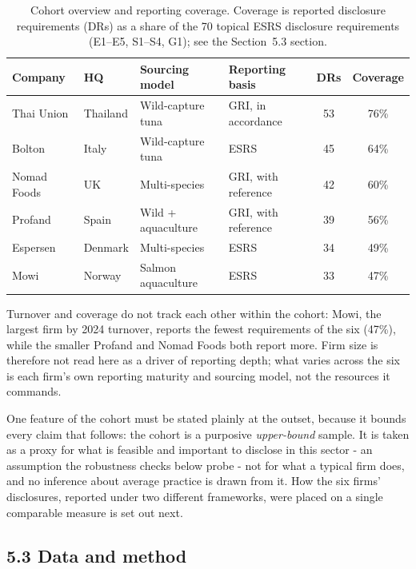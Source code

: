 \begin{table}[H]
\centering
\caption{Cohort overview and reporting coverage. Coverage is reported
disclosure requirements (DRs) as a share of the 70 topical ESRS disclosure
requirements (E1--E5, S1--S4, G1); see the Section~5.3 section.}
\label{tab:cohort-r}

\footnotesize
\begin{tabularx}{\textwidth}{@{} l l X X c c @{}}
\toprule
\textbf{Company} & \textbf{HQ} & \textbf{Sourcing model} & \textbf{Reporting basis} &
\textbf{DRs} & \textbf{Coverage} \\
\midrule
Thai Union  & Thailand & Wild-capture tuna & GRI, in accordance & 53 & 76\% \\
Bolton      & Italy    & Wild-capture tuna & ESRS            & 45 & 64\% \\
Nomad Foods & UK       & Multi-species     & GRI, with reference & 42 & 60\% \\
Profand     & Spain    & Wild + aquaculture & GRI, with reference & 39 & 56\% \\
Espersen    & Denmark  & Multi-species     & ESRS            & 34 & 49\% \\
Mowi        & Norway   & Salmon aquaculture & ESRS           & 33 & 47\% \\
\bottomrule
\end{tabularx}
\end{table}

Turnover and coverage do not track each other within the cohort: Mowi, the
largest firm by 2024 turnover, reports the fewest requirements of the six
(47\%), while the smaller Profand and Nomad Foods both report more. Firm size
is therefore not read here as a driver of reporting depth; what varies across
the six is each firm's own reporting maturity and sourcing model, not the
resources it commands.

One feature of the cohort must be stated plainly at the outset, because it bounds
every claim that follows: the cohort is a purposive \emph{upper-bound} sample. It
is taken as a proxy for what is feasible and important to disclose in this sector - an
assumption the robustness checks below probe - not for what a typical firm does,
and no inference about average practice is drawn from it. How the six firms'
disclosures, reported under two different frameworks, were placed on a single
comparable measure is set out next.

\FloatBarrier
\subsection{5.3 Data and method}\label{cohort-method}

